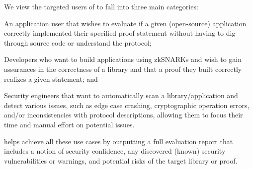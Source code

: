 We view the targeted users of \snarkprobe to fall into three main categories:
\begin{enumerate*}
\item An application user that wishes to evaluate if a given (open-source) application correctly implemented their specified proof statement without having to dig through source code or understand the protocol;
\item Developers who want to build applications using zkSNARKs and wish to gain assurances in the correctness of a library and that a proof they built correctly realizes a given statement;
and \item Security engineers that want to automatically scan a library/application and detect various issues, such as edge case crashing, cryptographic operation errors, and/or inconsistencies with protocol descriptions, allowing them to focus their time and manual effort on potential issues.%
\end{enumerate*}
\snarkprobe helps achieve all these use cases by outputting a full evaluation report that includes a notion of security confidence, any discovered (known) security vulnerabilities or warnings, and potential risks of the target library or proof.


